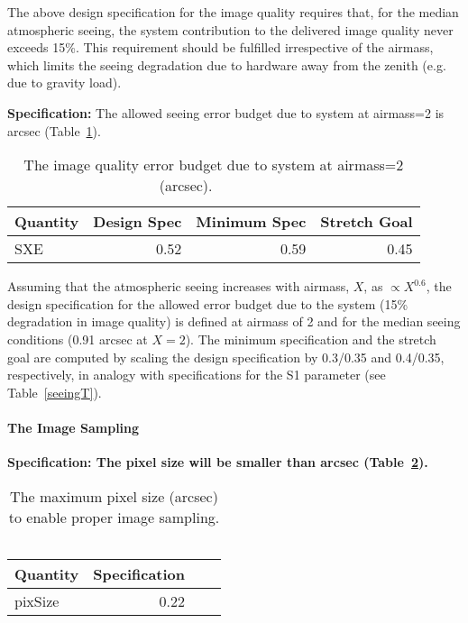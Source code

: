 The above design specification for the image quality
requires that, for the median atmospheric seeing, the system
contribution to the delivered image quality never exceeds 15\%.
This requirement should be fulfilled irrespective of the airmass,
which limits the seeing degradation due to hardware away from the
zenith (e.g. due to gravity load).

{\bf Specification:}
The allowed seeing error budget due to system at airmass=2 is
arcsec (Table~\ref{SXEtable}).

\begin{table}[h]
\begin{tabular}{|l|r|r|r|}
\hline
        Quantity  &  Design Spec & Minimum Spec & Stretch Goal \\
\hline
            SXE      &        0.52       &        0.59           &        0.45     \\
\hline
\end{tabular}
\caption{The image quality error budget due to system at airmass=2 (arcsec).  \,\,\,\,\,\,\,\, \,\,\,\,\,\,\,\,\,\,\,}
\label{SXEtable}
\end{table}

Assuming that the atmospheric seeing increases with airmass, $X$, as $\propto X^{0.6}$,
the design specification for the allowed error budget due to the system (15\% degradation in image quality)
is defined at airmass of 2 and for the median seeing conditions (0.91 arcsec at $X=2$). The minimum specification
and the stretch goal are computed by scaling the design specification by 0.3/0.35 and 0.4/0.35,
respectively, in analogy with specifications for the S1 parameter (see Table~\ref{seeingT}).





\paragraph{The Image Sampling \\}

{\bf Specification: The pixel size will be smaller than
 arcsec (Table~\ref{pixSize}). }
\begin{table}[h]
\begin{tabular}{|l|r|r|r|}
\hline
        Quantity  & Specification \\
\hline
       pixSize     &        0.22      \\
\hline
\end{tabular}
\caption{The maximum pixel size (arcsec) to enable proper image sampling. \,\,\,\,\,\,\,\,\,\,\,\,\,\, \,\,\,\,\,\,\,\, }
\label{pixSize}
\end{table}

